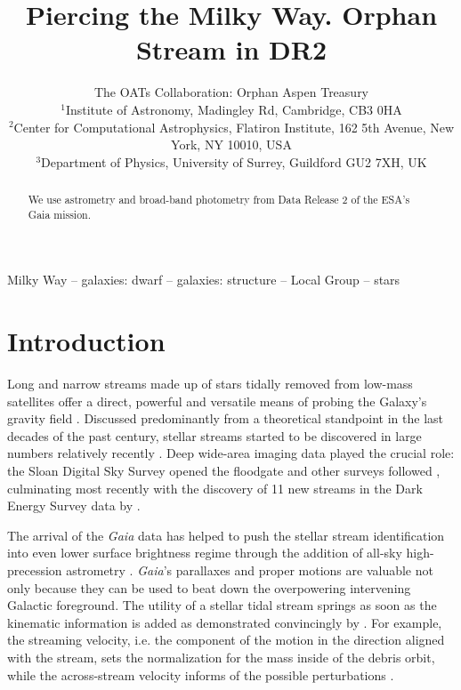 \documentclass[a4paper,useAMS,usenatbib]{mnras}
\title[Orphan Stream in \gaia DR2]{Piercing the Milky Way. Orphan
  Stream in \gaia DR2}
\author[The OATs Collaboration]{The OATs Collaboration: Orphan Aspen Treasury\\
  $^{1}$Institute of Astronomy, Madingley Rd, Cambridge, CB3 0HA\\
  $^{2}$Center for Computational Astrophysics, Flatiron Institute, 162 5th Avenue, New York, NY 10010, USA\\
  $^{3}$Department of Physics, University of Surrey, Guildford GU2 7XH, UK\\
}
\newcommand{\Gaia}{{\it Gaia}}
\newcommand{\gaia}{\textit{Gaia} }
\begin{document}
\maketitle

\label{firstpage}

\begin{abstract}
We use astrometry and broad-band photometry from Data Release 2 of the
ESA's Gaia mission.

\end{abstract}

\begin{keywords}
Milky Way -- galaxies: dwarf -- galaxies: structure -- Local Group -- stars
\end{keywords}

\section{Introduction}

Long and narrow streams made up of stars tidally removed from low-mass
satellites offer a direct, powerful and versatile means of probing the
Galaxy's gravity field \citep[see e.g.][]{Donald1982, Kuhn1993,
  Donald1995,Johnston1996,Helmi1999,Johnston1999,Murali1999}. Discussed
predominantly from a theoretical standpoint in the last decades of the
past century, stellar streams started to be discovered in large
numbers relatively recently
\citep[e.g.][]{Ibata2001,Odenkirchen2001,Newberg2002,
  Majewski2003,FOS,Grillmair2006}. Deep wide-area imaging data played
the crucial role: the Sloan Digital Sky Survey \citep[SDSS,
  see][]{Gunn1998,York2000,SDSS_DR8,SDSS_DR12} opened the floodgate
\citep[e.g.][]{OS_C,OS_V,Grillmair2009,Newberg2009,Koposov2012,
  Bonaca2012} and other surveys followed
\citep[e.g.][]{Koposov2014,Bernard2016,Balbinot2016}, culminating most
recently with the discovery of 11 new streams in the Dark Energy
Survey data \citep[DES, see][]{DES2005,DES2016} by \citet{Shipp2018}.

The arrival of the \gaia data \citep[see][]{Prusti2016, Brown2018} has
helped to push the stellar stream identification into even lower
surface brightness regime through the addition of all-sky
high-precession astrometry
\citep[see][]{Myeong2018,Ibata2018,Koppelman2018,Malhan2018,Adrian2018,CloudsArms}.
\Gaia's parallaxes and proper motions are valuable not only because
they can be used to beat down the overpowering intervening Galactic
foreground. The utility of a stellar tidal stream springs as soon as
the kinematic information is added as demonstrated convincingly by
\citet{Koposov2010}. For example, the streaming velocity, i.e. the
component of the motion in the direction aligned with the stream, sets
the normalization for the mass inside of the debris orbit, while the
across-stream velocity informs of the possible perturbations
\citep[see e.g.][]{Erkal2018}.
\end{document}
